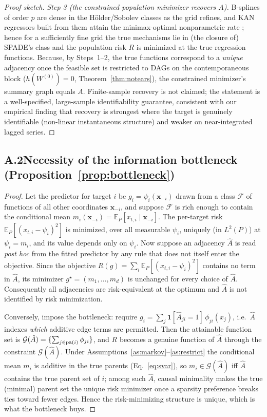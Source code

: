 \begin{proof}[Proof sketch]
\emph{Step 3 (the constrained population minimizer recovers $A$).} B-splines of
order $p$ are dense in the H\"older/Sobolev classes as the grid refines, and KAN
regressors built from them attain the minimax-optimal nonparametric rate
\citep{Liu2024,liu2025kanconvergence}; hence for a sufficiently fine grid the
true mechanisms lie in (the closure of) SPADE's class and the population risk
$R$ is minimized at the true regression functions. Because, by Steps~1--2, the
true functions correspond to a \emph{unique} adjacency once the feasible set is
restricted to DAGs on the contemporaneous block ($h(W^{(0)})=0$,
Theorem~\ref{thm:notears}), the constrained minimizer's summary graph equals $A$.
Finite-sample recovery is not claimed; the statement is a well-specified,
large-sample identifiability guarantee, consistent with our empirical finding
that recovery is strongest where the target is genuinely identifiable (non-linear
instantaneous structure) and weaker on near-integrated lagged series.
\end{proof}

\subsection*{A.2\quad Necessity of the information bottleneck (Proposition~\ref{prop:bottleneck})}

\begin{proof}
Let the predictor for target $i$ be $g_i=\psi_i(\mathbf{x}_{-i})$ drawn from a
class $\mathcal{F}$ of functions of all other coordinates
$\mathbf{x}_{-i}$, and suppose $\mathcal{F}$ is rich enough to contain the
conditional mean $m_i(\mathbf{x}_{-i})=\mathbb{E}_P[x_{t,i}\mid\mathbf{x}_{-i}]$.
The per-target risk $\mathbb{E}_P[(x_{t,i}-\psi_i)^2]$ is minimized, over all
measurable $\psi_i$, uniquely (in $L^2(P)$) at $\psi_i=m_i$, and its value depends
only on $\psi_i$. Now suppose an adjacency $\hat A$ is read \emph{post hoc} from
the fitted predictor by any rule that does not itself enter the objective. Since
the objective $R(g)=\sum_i\mathbb{E}_P[(x_{t,i}-\psi_i)^2]$ contains no term in
$\hat A$, its minimizer $g^\star=(m_1,\dots,m_d)$ is unchanged for every choice of
$\hat A$. Consequently all adjacencies are risk-equivalent at the optimum and
$\hat A$ is not identified by risk minimization.

Conversely, impose the bottleneck: require
$g_i=\sum_{j}\mathbf{1}[\hat A_{ji}=1]\,\phi_{ji}(x_j)$, i.e.\ $\hat A$ indexes
\emph{which} additive edge terms are permitted. Then the attainable function set
is $\mathcal{G}(\hat A)=\{\sum_{j\in\mathrm{pa}(i)}\phi_{ji}\}$, and $R$ becomes a genuine
function of $\hat A$ through the constraint $\mathcal{G}(\hat A)$. Under
Assumptions~\ref{as:markov}--\ref{as:restrict} the conditional mean $m_i$ is
additive in the true parents (Eq.~\ref{eq:svar}), so $m_i\in\mathcal{G}(\hat A)$
iff $\hat A$ contains the true parent set of $i$; among such $\hat A$, causal
minimality makes the true (minimal) parent set the unique risk minimizer once a
sparsity preference breaks ties toward fewer edges. Hence the risk-minimizing
structure is unique, which is what the bottleneck buys.
\end{proof}

